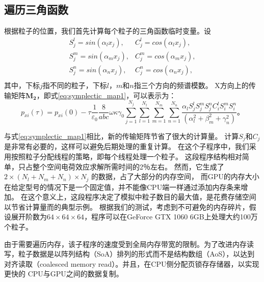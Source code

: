 \subsection{遍历三角函数}
根据粒子的位置，我们首先计算每个粒子的三角函数临时变量。设
\begin{equation}
\begin{array}{cc}
    S^{l}_j =sin(\alpha_l x_j), & C^{l}_j =cos(\alpha_l x_j),  \\
    S^{m}_j =sin(\alpha_m x_j), & C^{m}_j =cos(\alpha_m x_j),  \\
    S^{n}_j =sin(\alpha_n x_j), & C^{n}_j =cos(\alpha_n x_j),  \\
\end{array}
\end{equation}
其中，下标$j$指不同的粒子，下标$l$，$m$和$n$指三个方向的频谱模数。
X方向上的传输矩阵$\mathbf{M_2}$，即式\eqref{eq:symplectic_map1}，可以表示为：
\begin{equation}\label{eq:symplectic_map2}
{{p}_{xi}}(\tau )={{p}_{xi}}(0)-\tau \frac{1}{{{\varepsilon }_{0}}}\frac{8}{abc}\omega \kappa {{\gamma }_{0}}\sum\limits_{j=1}^{{{N}_{j}}}{\sum\limits_{l=1}^{{{N}_{l}}}{\sum\limits_{m=1}^{{{N}_{m}}}{\sum\limits_{n=1}^{{{N}_{n}}}{\frac{{{\alpha }_{l}}S_{j}^{l}S_{j}^{m}S_{j}^{n}C_{i}^{l}S_{i}^{m}S_{i}^{n}}{(\alpha _{l}^{2}+\beta _{m}^{2}+\gamma _{n}^{2})}}}}} \text{。}
\end{equation}

与式\eqref{eq:symplectic_map1}相比，新的传输矩阵节省了很大的计算量。
计算$S_ {j} $和$C_ {j}$是非常有必要的，这样可以避免后期处理的重复计算。
在这个子程序中，我们采用按照粒子分配线程的策略，即每个线程处理一个粒子。
这段程序结构相对简单，只占整个空间电荷效应求解所需时间的2％左右。
然而，它生成了$ 2 \times({{N}_{l}} + {{N}_{m}} + {{N}_{n}})\times {{N} _ {j}} $ 的数据，占了大部分的内存空间，
而GPU的内存大小在给定型号的情况下是一个固定值，并不能像CPU端一样通过添加内存条来增加。
在这个意义上，这段程序决定了模拟中粒子数目的最大值，是花费存储空间以节省计算量而的典型示例。
根据我们的测试，考虑到不可避免的内存碎片，假设展开阶数为$64\times64\times64$，程序可以在GeForce GTX 1060 6GB上处理大约100万个粒子。

由于需要遍历内存，该子程序的速度受到全局内存带宽的限制。为了改进内存读写，粒子数据是以阵列结构（SoA）排列的形式而不是结构数组（AoS），以达到对齐读取（coalesced memory read）。并且，在CPU侧分配页锁存存储器，以实现更快的 CPU与GPU之间的数据复制。

